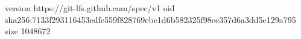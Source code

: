 version https://git-lfs.github.com/spec/v1
oid sha256:7133f293116453edfc559f828769ebc1d6b582325f98ee357d6a3dd5e129a795
size 1048672
